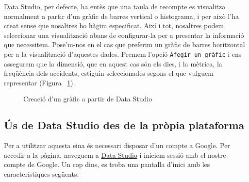 \documentclass[11pt,longbibliography]{article}
\theoremstyle{definition}
\theoremstyle{remark}
\begin{document}
Data Studio, per defecte, ha entès que una taula de recompte es visualitza normalment a partir d'un gràfic de barres vertical o histograma, i per això l'ha creat sense que nosaltres ho hàgim especificat. Així i tot, nosaltres podem seleccionar una visualització abans de configurar-la per a presentar la informació que necessitem. Pose'm-nos en el cas que preferim un gràfic de barres horitzontal per a la visualització d'aquestes dades. Premem l'opció \verb|Afegir un gràfic| i ens assegurem que la dimensió, que en aquest cas són els dies, i la mètrica, la freqüència dels accidents, estiguin seleccionades segons el que vulguem representar (Figura ~\ref{fig:bq28}). 

\begin{figure}[h!]
\par
{}%
\hfill
{}%
\par

\caption{Creació d'un gràfic a partir de Data Studio}
\label{fig:bq28}
\end{figure}

\subsection{Ús de Data Studio des de la pròpia plataforma}

Per a utilitzar aquesta eina és necessari disposar d’un compte a Google. Per accedir a la pàgina, naveguem a \href{https://datastudio.google.com}{Data Studio} i iniciem sessió amb el nostre compte de Google. Un cop dins, es troba una pantalla d’inici amb les característiques següents:
\end{document}
